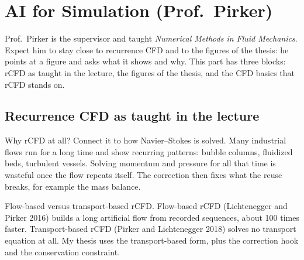 \section{AI for Simulation (Prof.\ Pirker)}

Prof.\ Pirker is the supervisor and taught \emph{Numerical Methods in Fluid Mechanics}. Expect him
to stay close to recurrence CFD and to the figures of the thesis: he points at a figure and asks
what it shows and why. This part has three blocks: rCFD as taught in the lecture, the figures of the
thesis, and the CFD basics that rCFD stands on.

\subsection{Recurrence CFD as taught in the lecture}

\begin{qabox}{Why rCFD at all? Connect it to how Navier--Stokes is solved.}
\explain Many industrial flows run for a long time and show recurring patterns: bubble columns,
fluidized beds, turbulent vessels. Solving momentum and pressure for all that time is wasteful once
the flow repeats itself. The correction then fixes what the reuse breaks, for example the mass
balance.
\end{qabox}

\begin{qabox}{Flow-based versus transport-based rCFD.}
\explain Flow-based rCFD (Lichtenegger and Pirker 2016) builds a long artificial flow from recorded
sequences, about 100 times faster. Transport-based rCFD (Pirker and Lichtenegger 2018) solves no
transport equation at all. My thesis uses the transport-based form, plus the correction hook and
the conservation constraint.
\end{qabox}

